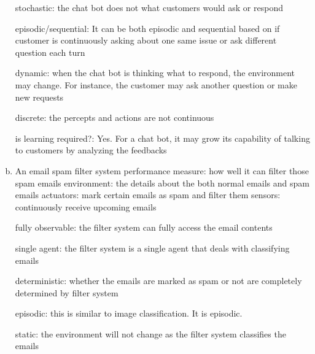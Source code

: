 \documentclass[11pt]{article}
\begin{document}
\begin{enumerate}[(a)]
    stochastic: the chat bot does not what customers would ask or respond \newline
    
    episodic/sequential: It can be both episodic and sequential based on if customer is continuously asking about one same issue or ask different question each turn \newline
    
    dynamic: when the chat bot is thinking what to respond, the environment may change. For instance, the customer may ask another question or make new requests \newline
    
    discrete: the percepts and actions are not continuous \newline
    
    is learning required?: Yes. For a chat bot, it may grow its capability of talking to customers by analyzing the feedbacks \newline
    
    
    
    \item An email spam filter system \newline
    performance measure: how well it can filter those spam emails  \newline
    environment: the details about the both normal emails and spam emails \newline
    actuators: mark certain emails as spam and filter them  \newline
    sensors: continuously receive upcoming emails \newline
    
    fully observable: the filter system can fully access the email contents \newline
    
    single agent: the filter system is a single agent that deals with classifying emails \newline
    
    deterministic: whether the emails are marked as spam or not are completely determined by filter system \newline
    
    episodic: this is similar to image classification. It is episodic. \newline
    
    static: the environment will not change as the filter system classifies the emails \newline
    

\end{enumerate}
\end{document}
